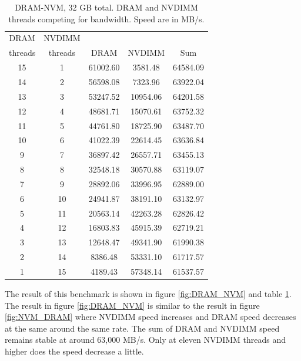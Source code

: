 \documentclass[12pt,a4paper,USenglish]{article}      %
\begin{document}
\begin{table}[!hbtp]
\centering
\begin{tabular}{ |c|c|c|c|c| }
\hline
DRAM & NVDIMM & & & \\
threads & threads & DRAM & NVDIMM & Sum \\
\hline
15 & 1 & 61002.60 & 3581.48 & 64584.09 \\
\hline
14 & 2 & 56598.08 & 7323.96 & 63922.04 \\
\hline
13 & 3 & 53247.52 & 10954.06 & 64201.58 \\
\hline
12 & 4 & 48681.71 & 15070.61 & 63752.32 \\
\hline
11 & 5 & 44761.80 & 18725.90 & 63487.70 \\
\hline
10 & 6 & 41022.39 & 22614.45 & 63636.84 \\
\hline
9 & 7 & 36897.42 & 26557.71 & 63455.13 \\
\hline
8 & 8 & 32548.18 & 30570.88 & 63119.07 \\
\hline
7 & 9 & 28892.06 & 33996.95 & 62889.00 \\
\hline
6 & 10 & 24941.87 & 38191.10 & 63132.97 \\
\hline
5 & 11 & 20563.14 & 42263.28 & 62826.42 \\
\hline
4 & 12 & 16803.83 & 45915.39 & 62719.21 \\
\hline
3 & 13 & 12648.47 & 49341.90 & 61990.38 \\
\hline
2 & 14 & 8386.48 & 53331.10 & 61717.57 \\
\hline
1 & 15 & 4189.43 & 57348.14 & 61537.57 \\
\hline
\end{tabular}
\caption{DRAM-NVM, 32 GB total. DRAM and NVDIMM threads competing for bandwidth. Speed are in MB/s.}
\label{tab:DRAM_NVM}
\end{table}

The result of this benchmark is shown in figure \ref{fig:DRAM_NVM} and table \ref{tab:DRAM_NVM}. The result in figure \ref{fig:DRAM_NVM} is similar to the result in figure \ref{fig:NVM_DRAM} where NVDIMM speed increases and DRAM speed decreases at the same around the same rate. The sum of DRAM and NVDIMM speed remains stable at around 63,000 MB/s. Only at eleven NVDIMM threads and higher does the speed decrease a little. 
\end{document}
